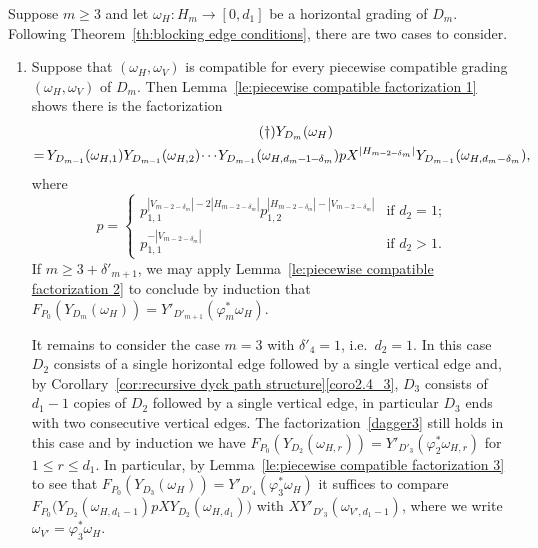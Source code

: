 \documentclass[10pt]{amsart}
\theoremstyle{definition}
\newcommand{\ie}{i.e.\ }
\newcommand*{\mk}{\mkern -1mu}
\newcommand*{\Mk}{\mkern -2mu}
\begin{document}
Suppose $m\ge3$ and let $\omega_H:H_m\to[0,d_1]$ be a horizontal grading of $D_m$.
Following Theorem~\ref{th:blocking edge conditions}, there are two cases to consider.
\begin{enumerate}[label=(\alph*)]
 \item Suppose that $(\omega_H,\omega_V)$ is compatible for every piecewise compatible grading $(\omega_H,\omega_V)$ of $D_m$.
 Then Lemma~\ref{le:piecewise compatible factorization 1} shows there is the factorization
 \begin{multline}\label{dagger3}
 \tag{$\dagger$}
 Y_{D_m}(\omega_H)\\
 =\Mk Y_{D_{m\mk -\mk 1}}(\omega_{H,1})Y_{D_{m\mk -\mk 1}}(\omega_{H,2})\Mk\cdots\Mk Y_{D_{m\mk -\mk 1}}(\omega_{H,d_m\mk -\mk 1\mk -\mk \delta_m})pX^{|H_{m\mk -\mk 2\mk -\mk \delta_m}|} Y_{D_{m-1}}(\omega_{H,d_m-\delta_m}),
 \end{multline}
 where 
 \[p=\begin{cases} p_{1,1}^{|V_{m-2-\delta_m}|-2|H_{m-2-\delta_m}|}p_{1,2}^{|H_{m-2-\delta_m}|-|V_{m-2-\delta_m}|} & \text{if $d_2=1$;}\\ p_{1,1}^{-|V_{m-2-\delta_m}|} & \text{if $d_2>1$.}\end{cases}\]
 If $m\ge3+\delta'_{m+1}$, we may apply Lemma~\ref{le:piecewise compatible factorization 2} to conclude by induction that $F_{P_0}(Y_{D_m}(\omega_H))=Y'_{D'_{m+1}}(\varphi^*_m\omega_H)$.

 It remains to consider the case $m=3$ with $\delta'_4=1$, \ie $d_2=1$.
 In this case $D_2$ consists of a single horizontal edge followed by a single vertical edge and, by Corollary~\ref{cor:recursive dyck path structure}\ref{coro2.4_3}, $D_3$ consists of $d_1-1$ copies of $D_2$ followed by a single vertical edge, in particular $D_3$ ends with two consecutive vertical edges.
 The factorization~\eqref{dagger3} still holds in this case and by induction we have $F_{P_0}(Y_{D_2}(\omega_{H,r}))=Y'_{D'_3}(\varphi^*_2\omega_{H,r})$ for $1\le r\le d_1$.
 In particular, by Lemma~\ref{le:piecewise compatible factorization 3} to see that $F_{P_0}(Y_{D_3}(\omega_H))=Y'_{D'_4}(\varphi^*_3\omega_H)$ it suffices to compare $F_{P_0}\big(Y_{D_2}(\omega_{H,d_1-1})pXY_{D_2}(\omega_{H,d_1})\big)$ with $XY'_{D'_3}(\omega_{V',d_1-1})$, where we write $\omega_{V'}=\varphi^*_3\omega_H$.


\end{enumerate}
\end{document}
